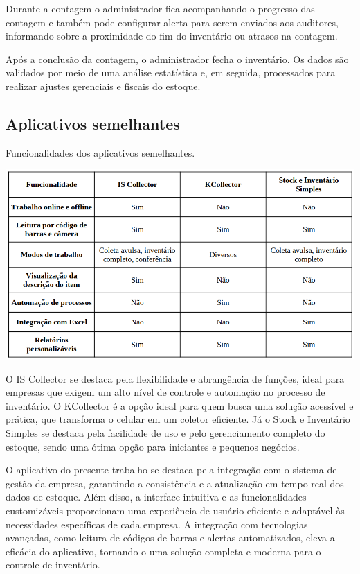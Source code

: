 Durante a contagem o administrador fica acompanhando o progresso das contagem e também pode configurar alerta para serem enviados aos auditores, informando sobre a proximidade do fim do inventário ou atrasos na contagem.

Após a conclusão da contagem, o administrador fecha o inventário. Os dados são validados por meio de uma análise estatística e, em seguida, processados para realizar ajustes gerenciais e fiscais do estoque.

\subsection{Aplicativos semelhantes}

\begin{table}[H]
    \centering
    \caption{Funcionalidades dos aplicativos semelhantes.}
    \label{tab:comparativos}
    \includegraphics[width=1.0\textwidth]{tables/comparativo.png}
\end{table}

O IS Collector se destaca pela flexibilidade e abrangência de funções, ideal para empresas que exigem um alto nível de controle e automação no processo de inventário. O KCollector é a opção ideal para quem busca uma solução acessível e prática, que transforma o celular em um coletor eficiente. Já o Stock e Inventário Simples se destaca pela facilidade de uso e pelo gerenciamento completo do estoque, sendo uma ótima opção para iniciantes e pequenos negócios.

O aplicativo do presente trabalho se destaca pela integração com o sistema de gestão da empresa, garantindo a consistência e a atualização em tempo real dos dados de estoque. Além disso, a interface intuitiva e as funcionalidades customizáveis proporcionam uma experiência de usuário eficiente e adaptável às necessidades específicas de cada empresa. A integração com tecnologias avançadas, como leitura de códigos de barras e alertas automatizados, eleva a eficácia do aplicativo, tornando-o uma solução completa e moderna para o controle de inventário.

